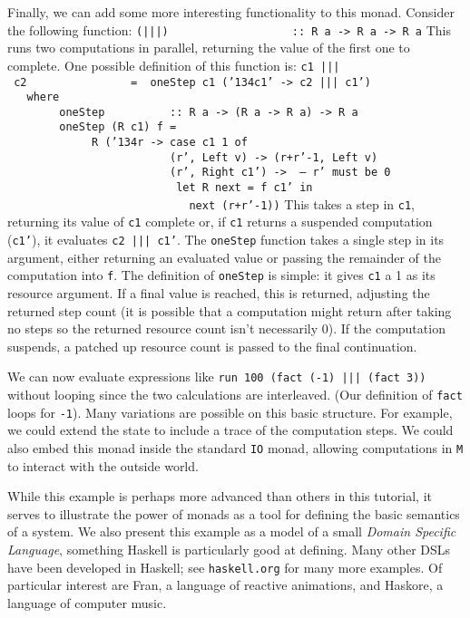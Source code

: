 Finally, we can add some more interesting functionality to this
monad.  Consider the following function:
\bprog
\mbox{\tt (|||)\ \ \ \ \ \ \ \ \ \ \ \ \ \ \ \ \ \ \ ::\ R\ a\ ->\ R\ a\ ->\ R\ a}
\eprog
This runs two computations in parallel, returning the value of the
first one to complete.  One possible definition of this function is:
\bprog
\mbox{\tt c1\ |||\ c2\ \ \ \ \ \ \ \ \ \ \ \ \ \ \ \ =\ \ oneStep\ c1\ ({\char'134}c1'\ ->\ c2\ |||\ c1')}\\
\mbox{\tt \ \ \ where}\\
\mbox{\tt \ \ \ \ \ \ \ \ oneStep\ \ \ \ \ \ \ \ \ \ ::\ R\ a\ ->\ (R\ a\ ->\ R\ a)\ ->\ R\ a}\\
\mbox{\tt \ \ \ \ \ \ \ \ oneStep\ (R\ c1)\ f\ =}\\
\mbox{\tt \ \ \ \ \ \ \ \ \ \ \ \ \ R\ ({\char'134}r\ ->\ case\ c1\ 1\ of}\\
\mbox{\tt \ \ \ \ \ \ \ \ \ \ \ \ \ \ \ \ \ \ \ \ \ \ \ \ \ (r',\ Left\ v)\ ->\ (r+r'-1,\ Left\ v)}\\
\mbox{\tt \ \ \ \ \ \ \ \ \ \ \ \ \ \ \ \ \ \ \ \ \ \ \ \ \ (r',\ Right\ c1')\ ->\ \ --\ r'\ must\ be\ 0}\\
\mbox{\tt \ \ \ \ \ \ \ \ \ \ \ \ \ \ \ \ \ \ \ \ \ \ \ \ \ \ let\ R\ next\ =\ f\ c1'\ in}\\
\mbox{\tt \ \ \ \ \ \ \ \ \ \ \ \ \ \ \ \ \ \ \ \ \ \ \ \ \ \ \ \ next\ (r+r'-1))}
\eprog
This takes a step in \mbox{\tt c1}, returning its value of \mbox{\tt c1} complete or, if
\mbox{\tt c1} returns a suspended computation (\mbox{\tt c1'}), it evaluates
\mbox{\tt c2\ |||\ c1'}.  The \mbox{\tt oneStep} function takes a single step in its
argument, either returning an evaluated value or passing the remainder
of the computation into \mbox{\tt f}.  The definition of \mbox{\tt oneStep} is simple:
it gives \mbox{\tt c1} a 1 as its resource argument.  If a final value is
reached, this is returned, adjusting the returned step count (it is
possible that a computation might return after taking no steps so the
returned resource count isn't necessarily 0).  If the computation
suspends, a patched up resource count is passed to the final
continuation. 

We can now evaluate expressions like \mbox{\tt run\ 100\ (fact\ (-1)\ |||\ (fact\ 3))}
without looping since the two calculations are interleaved.  (Our
definition of \mbox{\tt fact} loops for \mbox{\tt -1}).  
Many variations are possible on this basic
structure.  For example, we could extend the state to include a trace
of the computation steps.  We could also embed this monad inside the
standard \mbox{\tt IO} monad, allowing computations in \mbox{\tt M} to interact with the
outside world.
 
While this example is perhaps more advanced than others in this tutorial,
it serves to illustrate the power of monads as a tool for defining the
basic semantics of a system.  We also present this example as a model
of a small {\em Domain Specific Language}, something Haskell is
particularly good at defining.  Many other DSLs have been developed in
Haskell; see {\tt haskell.org} for many more examples.  Of particular
interest are Fran, a language of reactive animations, and Haskore, a
language of computer music.

